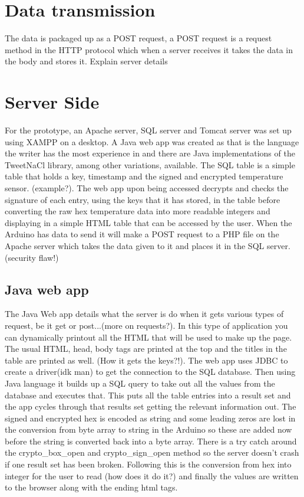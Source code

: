 
\section{Data transmission}
The data is packaged up as a POST request, a POST request is a request method in the HTTP protocol which when a server receives it takes the data in the body and stores it. Explain server details 
 
\section{Server Side}

For the prototype, an Apache server, SQL server and Tomcat server was set up using XAMPP on a desktop. A Java web app was created as that is the language the writer has the most experience in and there are Java implementations of the TweetNaCl library, among other variations, available. The SQL table is a simple table that holds a key, timestamp and the signed and encrypted temperature sensor. (example?). The web app upon being accessed decrypts and checks the signature of each entry, using the keys that it has stored, in the table before converting the raw hex temperature data into more readable integers and displaying in a simple HTML table that can be accessed by the user. When the Arduino has data to send it will make a POST request to a PHP file on the Apache server which takes the data given to it and places it in the SQL server. (security flaw!)

\subsection{Java web app}

The Java Web app details what the server is do when it gets various types of request, be it get or post...(more on requests?). In this type of application you can dynamically printout all the HTML that will be used to make up the page. The usual  HTML, head, body tags are printed at the top and the titles in the table are printed as well. (How it gets the keys?!). The web app uses JDBC to create a driver(idk man) to get the connection to the SQL database. Then using Java language it builds up a SQL query to take out all the values from the database and executes that. This puts all the table entries into a result set and the app cycles through that results set getting the relevant information out. The signed and encrypted hex is encoded as string and some leading zeros are lost in the conversion from byte array to string in the Arduino so these are added now before the string is converted back into a byte array. There is a try catch around the crypto\_box\_open and crypto\_sign\_open method so the server doesn't crash if one result set has been broken. Following this is the conversion from hex into integer for the user to read (how does it do it?) and finally the values are written to the browser along with the ending html tags.

